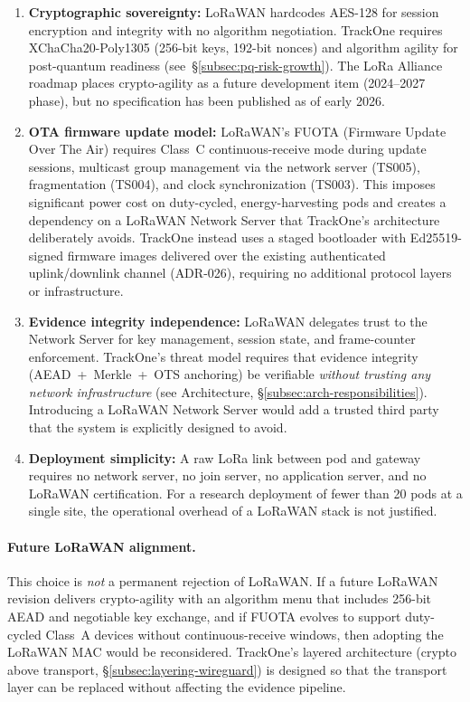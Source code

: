 \begin{enumerate}[nosep]
        \item \textbf{Cryptographic sovereignty:}
        \ac{LoRa}WAN hardcodes AES-128 for session encryption and integrity
        with no algorithm negotiation.
        TrackOne requires XChaCha20-Poly1305 (256-bit keys, 192-bit nonces)
        and algorithm agility for post-quantum readiness
        (see~\S\ref{subsec:pq-risk-growth}).
        The \ac{LoRa} Alliance roadmap places crypto-agility as a future
        development item (2024--2027 phase), but no specification has been
        published as of early 2026.
        \item \textbf{OTA firmware update model:}
        \ac{LoRa}WAN's FUOTA (Firmware Update Over The Air) requires Class~C
        continuous-receive mode during update sessions, multicast group
        management via the network server (TS005), fragmentation (TS004),
        and clock synchronization (TS003).
        This imposes significant power cost on duty-cycled, energy-harvesting
        pods and creates a dependency on a \ac{LoRa}WAN Network Server that
        TrackOne's architecture deliberately avoids.
        TrackOne instead uses a staged bootloader with Ed25519-signed firmware
        images delivered over the existing authenticated uplink/downlink
        channel (\ac{ADR}-026), requiring no additional protocol layers or
        infrastructure.
        \item \textbf{Evidence integrity independence:}
        \ac{LoRa}WAN delegates trust to the Network Server for key management,
        session state, and frame-counter enforcement.
        TrackOne's threat model requires that evidence integrity
        (\ac{AEAD}~+~Merkle~+~\ac{OTS} anchoring) be verifiable \emph{without trusting
        any network infrastructure} (see Architecture,
        \S\ref{subsec:arch-responsibilities}).
        Introducing a \ac{LoRa}WAN Network Server would add a trusted third party
        that the system is explicitly designed to avoid.
        \item \textbf{Deployment simplicity:}
        A raw \ac{LoRa} link between pod and gateway requires no network server,
        no join server, no application server, and no \ac{LoRa}WAN certification.
        For a research deployment of fewer than 20 pods at a single site,
        the operational overhead of a \ac{LoRa}WAN stack is not justified.
\end{enumerate}

\paragraph{Future LoRaWAN alignment.}
This choice is \emph{not} a permanent rejection of \ac{LoRa}WAN.
If a future \ac{LoRa}WAN revision delivers crypto-agility with an algorithm menu
that includes 256-bit \ac{AEAD} and negotiable key exchange, and if FUOTA evolves
to support duty-cycled Class~A devices without continuous-receive windows,
then adopting the \ac{LoRa}WAN MAC would be reconsidered.
TrackOne's layered architecture (crypto above transport,
\S\ref{subsec:layering-wireguard}) is designed so that the transport layer
can be replaced without affecting the evidence pipeline.

